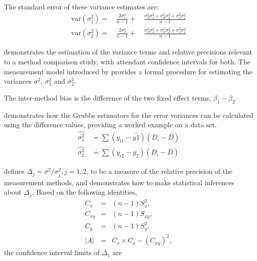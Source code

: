 \documentclass[12pt, a4paper]{report}
\theoremstyle{plain}
\theoremstyle{definition}
\theoremstyle{remark}
\begin{document}
	The standard error of these variance estimates are:
	\begin{eqnarray}
	\textrm{var}(\sigma^{2}_{1}) =\quad \frac{2\sigma^{4}_{1}}{n-1} +\quad
	\frac{\sigma^2_{S}\sigma^2_{1}+\sigma^2_{S}\sigma^2_{2}+\sigma^2_{1}\sigma^2_{2}
	}{n-1}\\
	\textrm{var}(\sigma^{2}_{2}) =\quad \frac{2\sigma^{4}_{2}}{n-1} +\quad
	\frac{\sigma^2_{S}\sigma^2_{1}+\sigma^2_{S}\sigma^2_{2}+\sigma^2_{1}\sigma^2_{2}
	}{n-1}\nonumber
	\end{eqnarray}
	
	
	\citet{kinsella} demonstrates the estimation of the variance terms and relative precisions relevant to a method comparison study, with attendant confidence intervals for both. The measurement model introduced by \citet{Grubbs48,Grubbs73} provides a formal procedure for estimating the variances $\sigma^2$, $\sigma^2_{1}$ and $\sigma^2_{2}$. 
	
	
	The inter-method bias is the difference of the two fixed effect terms, $\beta_{1}-\beta_{2}$.
	
	\citet{kinsella} demonstrates how the Grubbs estimators for the
	error variances can be calculated using the difference values,
	providing a worked example on a data set.
	\begin{eqnarray}
	\hat{\sigma^{2}_{1}}
	\quad=\sum{(y_{i1}-\bar{y{1}})(D_{i}-\bar{D})}\\
	\hat{\sigma^{2}_{2}} \quad=
	\sum{(y_{i2}-\bar{y_{2}})(D_{i}-\bar{D})} \nonumber
	\end{eqnarray}
	
	\citet{Thompson} defines $\Delta_j = \sigma^2 / \sigma^2_j, j=1,2$, to be a measure of the
	relative precision of the measurement methods, and demonstrates how to make statistical inferences about $\Delta_{j}$.
	Based on the following identities,
	\begin{eqnarray*}
		C_{x}&=&(n-1)S^2_{x},\nonumber\\
		C_{xy}&=&(n-1)S_{xy},\nonumber\\
		C_{y}&=&(n-1)S^2_{y},\nonumber\\
		|A| &=& C_{x}\times C_{y} - (C_{xy})^2,\nonumber
	\end{eqnarray*}
	\noindent the confidence interval limits of $\Delta_{1}$ are
	
\end{document}
